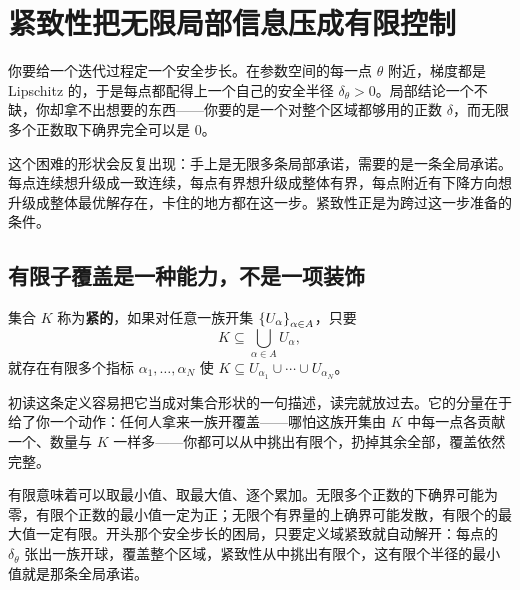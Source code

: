 \section{紧致性把无限局部信息压成有限控制}
\label{sec:12-Real-Analysis-Support/03-Topology-Basics/02}

你要给一个迭代过程定一个安全步长。在参数空间的每一点 \(\theta\) 附近，梯度都是 Lipschitz 的，于是每点都配得上一个自己的安全半径 \(\delta_\theta>0\)。局部结论一个不缺，你却拿不出想要的东西——你要的是一个对整个区域都够用的正数 \(\delta\)，而无限多个正数取下确界完全可以是 0。

这个困难的形状会反复出现：手上是无限多条局部承诺，需要的是一条全局承诺。每点连续想升级成一致连续，每点有界想升级成整体有界，每点附近有下降方向想升级成整体最优解存在，卡住的地方都在这一步。紧致性正是为跨过这一步准备的条件。

\subsection{有限子覆盖是一种能力，不是一项装饰}

\begin{definition}
集合 \(K\) 称为\textbf{紧的}，如果对任意一族开集 \(\left\{U_\alpha\right\}_{\alpha\in A}\)，只要
\[
K\subseteq\bigcup_{\alpha\in A}U_\alpha,
\]
就存在有限多个指标 \(\alpha_1,\dots,\alpha_N\) 使 \(K\subseteq U_{\alpha_1}\cup\cdots\cup U_{\alpha_N}\)。
\end{definition}

初读这条定义容易把它当成对集合形状的一句描述，读完就放过去。它的分量在于给了你一个动作：任何人拿来一族开覆盖——哪怕这族开集由 \(K\) 中每一点各贡献一个、数量与 \(K\) 一样多——你都可以从中挑出有限个，扔掉其余全部，覆盖依然完整。

有限意味着可以取最小值、取最大值、逐个累加。无限多个正数的下确界可能为零，有限个正数的最小值一定为正；无限个有界量的上确界可能发散，有限个的最大值一定有限。开头那个安全步长的困局，只要定义域紧致就自动解开：每点的 \(\delta_\theta\) 张出一族开球，覆盖整个区域，紧致性从中挑出有限个，这有限个半径的最小值就是那条全局承诺。

